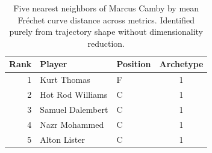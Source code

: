 \begin{table}[htbp]
  \centering\small
  \begin{tabular}{rllc}
    \toprule
    Rank & Player & Position & Archetype \\
    \midrule
    1 & Kurt Thomas & F & 1 \\
    2 & Hot Rod Williams & C & 1 \\
    3 & Samuel Dalembert & C & 1 \\
    4 & Nazr Mohammed & C & 1 \\
    5 & Alton Lister & C & 1 \\
    \bottomrule
  \end{tabular}
  \caption{Five nearest neighbors of Marcus Camby by mean Fr\'{e}chet curve distance across metrics. Identified purely from trajectory shape without dimensionality reduction.}
  \label{tab:Marcus_Camby_frechet_curve_neighbors}
\end{table}

